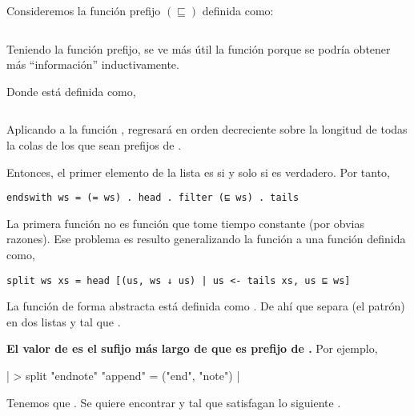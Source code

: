 

Consideremos la función prefijo $(\sqsubseteq)$ definida como:

\inputminted{haskell}{definiciones/prefix.hs}

Teniendo la función prefijo, se ve más útil la función  porque
se podría obtener más ``información'' inductivamente.

Donde  está definida como,

\inputminted{haskell}{definiciones/tails.hs}


Aplicando  a la función , regresará en orden decreciente sobre la longitud de
todas la colas de  los que sean prefijos de .


Entonces, el primer elemento de la lista es  si y solo si  es verdadero. Por tanto,

\begin{verbatim}
endswith ws = (= ws) . head . filter (⊑ ws) . tails
\end{verbatim}


La primera función  no es función que tome tiempo constante (por obvias razones). Ese problema es resulto generalizando la función
 a una función  definida como,

\begin{verbatim}
split ws xs = head [(us, ws ↓ us) | us <- tails xs, us ⊑ ws]
\end{verbatim}

La función  de forma abstracta está definida como . De ahí que  separa  (el patrón)
en dos listas  y  tal que .

\textbf{El valor de  es el sufijo más largo de  que es prefijo de .} Por ejemplo,

| > split "endnote" "append" = ("end", "note") |


Tenemos que .
Se quiere encontrar  y  tal que satisfagan lo siguiente .


